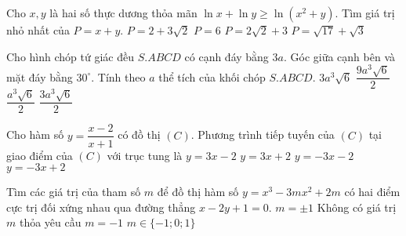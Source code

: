  \begin{ex}%
 	Cho $x,y$ là hai số thực dương thỏa mãn $\ln x + \ln y \geq \ln (x^2+y)$. Tìm giá trị nhỏ nhất của $P=x+y$.
 	\choice
 	{$P=2+3\sqrt{2}$}
 	{$P=6$}
 	{\True $P=2\sqrt{2}+3$}
 	{$P=\sqrt{17}+\sqrt{3}$}
 \end{ex}

\begin{ex}%
	Cho hình chóp tứ giác đều $S.ABCD$ có cạnh đáy bằng $3a$. Góc giữa cạnh bên và mặt đáy bằng $30^{\circ}$. Tính theo $a$ thể tích của khối chóp $S.ABCD$.
	\choice
	{$3a^3\sqrt{6}$}
	{$\dfrac{9a^3\sqrt{6}}{2}$}
	{$\dfrac{a^3\sqrt{6}}{2}$}
	{\True $\dfrac{3a^3\sqrt{6}}{2}$}
\end{ex}

\begin{ex}%
	Cho hàm số $y=\dfrac{x-2}{x+1}$ có đồ thị $(C)$. Phương trình tiếp tuyến của $(C)$ tại giao điểm của $(C)$ với trục tung là
	\choice
	{\True $y=3x-2$}
	{$y=3x+2$}
	{$y=-3x-2$}
	{$y=-3x+2$}
\end{ex}

\begin{ex}%
	Tìm các giá trị của tham số $m$ để đồ thị hàm số $y=x^3-3mx^2+2m$ có hai điểm cực trị đối xứng nhau qua đường thẳng $x-2y+1=0$.
	\choice
	{$m=\pm 1$}
	{Không có giá trị $m$ thỏa yêu cầu}
	{\True $m=-1$}
	{$m \in \{-1;0;1\}$}
\end{ex}

